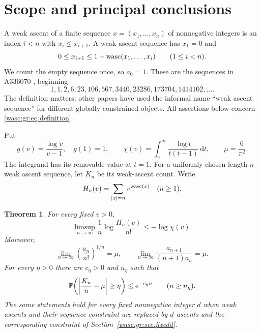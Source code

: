 \documentclass[11pt,a4paper]{article}
\newtheorem{theorem}{Theorem}[section]
\theoremstyle{remark}\newtheorem{remark}[theorem]{Remark}
\newcommand{\dd}{\,\mathrm d}\newcommand{\ee}{\mathrm e}\newcommand{\Wc}{\mathcal W}
\numberwithin{equation}{section}
\begin{document}
\section{Scope and principal conclusions}
A weak ascent of a finite sequence $x=(x_1,\ldots,x_n)$ of nonnegative integers is an index $i<n$ with $x_i\le x_{i+1}$. A weak ascent sequence has $x_1=0$ and
\begin{equation}\label{wasc:gr:eq:definition}
0\le x_{i+1}\le1+\operatorname{wasc}(x_1,\ldots,x_i)\qquad(1\le i<n).
\end{equation}
We count the empty sequence once, so $a_0=1$. These are the sequences in A336070 \cite{oeis,benyi}, beginning
\[
1,1,2,6,23,106,567,3440,23286,173704,1414102,\ldots.
\]
The definition matters: other papers have used the informal name ``weak ascent sequence'' for different globally constrained objects. All assertions below concern \eqref{wasc:gr:eq:definition}.

Put
\begin{equation}\label{wasc:gr:eq:chi}
g(v)=\frac{\log v}{v-1},\quad g(1)=1,\qquad
\chi(v)=\int_v^\infty\frac{\log t}{t(t-1)}\dd t,
\qquad \mu=\frac6{\pi^2}.
\end{equation}
The integrand has its removable value at $t=1$. For a uniformly chosen length-$n$ weak ascent sequence, let $K_n$ be its weak-ascent count. Write
\[
H_n(v)=\sum_{|x|=n}v^{\operatorname{wasc}(x)}\quad(n\ge1).
\]

\begin{theorem}\label{wasc:gr:thm:main}
For every fixed $v>0$,
\begin{equation}\label{wasc:gr:eq:tilt}
\limsup_{n\to\infty}\frac1n\log\frac{H_n(v)}{n!}\le-\log\chi(v).
\end{equation}
Moreover,
\begin{equation}\label{wasc:gr:eq:rootratio}
\lim_{n\to\infty}\left(\frac{a_n}{n!}\right)^{1/n}=\mu,
\qquad
\lim_{n\to\infty}\frac{a_{n+1}}{(n+1)a_n}=\mu.
\end{equation}
For every $\eta>0$ there are $c_\eta>0$ and $n_\eta$ such that
\begin{equation}\label{wasc:gr:eq:concentration}
\Prob\!\left(\left|\frac{K_n}{n}-\mu\right|\ge\eta\right)
\le \ee^{-c_\eta n}\qquad(n\ge n_\eta).
\end{equation}
The same statements hold for every fixed nonnegative integer $d$ when weak ascents and their sequence constraint are replaced by $d$-ascents and the corresponding constraint of Section~\ref{wasc:gr:sec:fixedd}.
\end{theorem}
\end{document}
